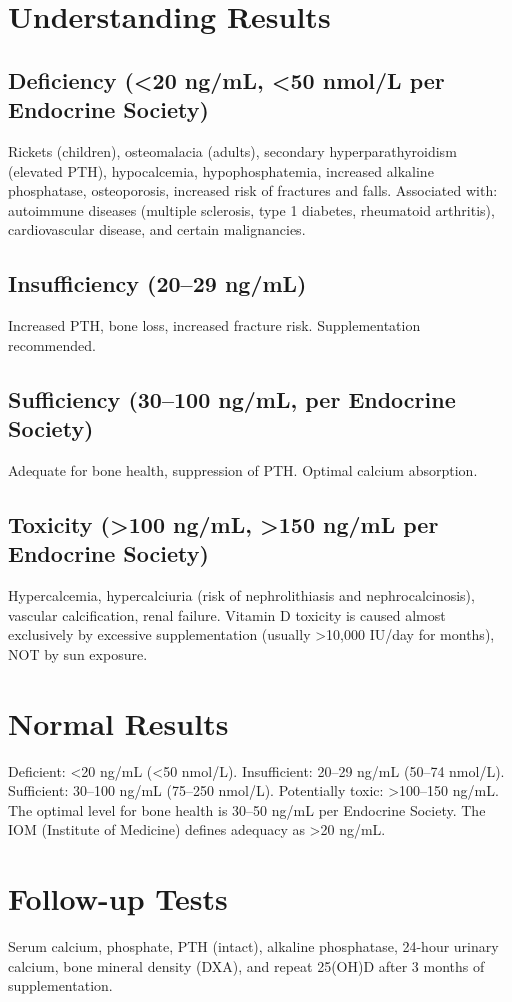 \section*{Understanding Results}
\subsection*{Deficiency (<20 ng/mL, <50 nmol/L per Endocrine Society)}
Rickets (children), osteomalacia (adults), secondary hyperparathyroidism (elevated PTH), hypocalcemia, hypophosphatemia, increased alkaline phosphatase, osteoporosis, increased risk of fractures and falls. Associated with: autoimmune diseases (multiple sclerosis, type 1 diabetes, rheumatoid arthritis), cardiovascular disease, and certain malignancies.
\subsection*{Insufficiency (20--29 ng/mL)}
Increased PTH, bone loss, increased fracture risk. Supplementation recommended.
\subsection*{Sufficiency (30--100 ng/mL, per Endocrine Society)}
Adequate for bone health, suppression of PTH. Optimal calcium absorption.
\subsection*{Toxicity (>100 ng/mL, >150 ng/mL per Endocrine Society)}
Hypercalcemia, hypercalciuria (risk of nephrolithiasis and nephrocalcinosis), vascular calcification, renal failure. Vitamin D toxicity is caused almost exclusively by excessive supplementation (usually >10,000 IU/day for months), NOT by sun exposure.
\section*{Normal Results}
Deficient: <20 ng/mL (<50 nmol/L). Insufficient: 20--29 ng/mL (50--74 nmol/L). Sufficient: 30--100 ng/mL (75--250 nmol/L). Potentially toxic: >100--150 ng/mL. The optimal level for bone health is 30--50 ng/mL per Endocrine Society. The IOM (Institute of Medicine) defines adequacy as >20 ng/mL.
\section*{Follow-up Tests}
Serum calcium, phosphate, PTH (intact), alkaline phosphatase, 24-hour urinary calcium, bone mineral density (DXA), and repeat 25(OH)D after 3 months of supplementation.
